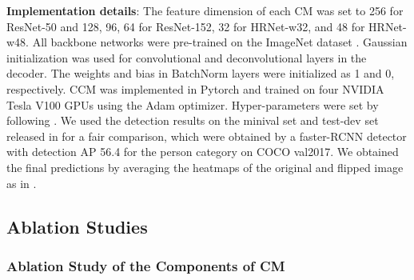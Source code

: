 \documentclass[twocolumn]{svjour3}          \smartqed  \usepackage{natbib}
\begin{document}
\textbf{Implementation details}: The feature dimension  of each CM was set to 256 for ResNet-50 and 128, 96, 64 for ResNet-152, 32 for HRNet-w32, and 48 for HRNet-w48. All backbone networks were pre-trained on the ImageNet dataset \citep{deng2009imagenet}. Gaussian initialization was used for convolutional and deconvolutional layers in the decoder. The weights and bias in BatchNorm layers were initialized as 1 and 0, respectively. CCM was implemented in Pytorch \citep{paszke2017automatic} and trained on four NVIDIA Tesla V100 GPUs using the Adam optimizer. Hyper-parameters were set by following \citep{xiao2018simple, sun2019deep}. We used the detection results on the minival set and test-dev set released in \citep{xiao2018simple} for a fair comparison, which were obtained by a faster-RCNN detector \citep{ren2015faster} with detection AP 56.4 for the person category on COCO val2017. We obtained the final predictions by averaging the heatmaps of the original and flipped image as in \citep{chen2018cascaded, newell2016stacked, xiao2018simple}.

\subsection{Ablation Studies}
\label{subsec:ablation}

\subsubsection{Ablation Study of the Components of CM}
\label{subsubsec:ablationmcm}
\end{document}
